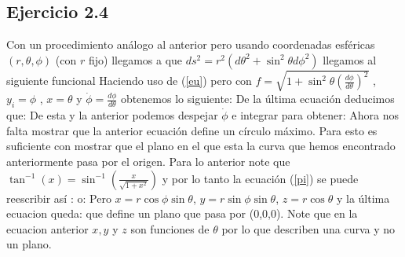 \subsection*{Ejercicio 2.4 }
Con un procedimiento an\'alogo al anterior pero usando coordenadas esf\'ericas $(r,\theta,\phi)$ (con $r$ fijo) llegamos a que $ds^2=r^2(d\theta^2+\sin^2 \theta d\phi^2) $ llegamos al siguiente funcional
Haciendo uso de (\ref{eu}) pero con $f=\sqrt{1+\sin^2\theta \left(\frac{d\phi}{d\theta}\right)^2}$ , $y_i=\phi$ , $x=\theta$ y $\dot \phi=\frac{d\phi}{d\theta}$
obtenemos lo siguiente:
De la \'ultima ecuaci\'on deducimos que:
De esta y la anterior podemos despejar $\dot \phi$ e integrar para obtener:
Ahora nos falta mostrar que la anterior ecuaci\'on define un c\'irculo m\'aximo. Para esto es suficiente con mostrar que el plano en el que esta la curva que hemos encontrado anteriormente pasa por el origen.
Para lo anterior note que $\tan^{-1}(x)=\sin^{-1}\left(\frac{x}{\sqrt{1+x^2}}\right)$ y por lo tanto la ecuaci\'on (\ref{pi}) se  puede reescribir as\'i :
o:
Pero $x=r \cos \phi \sin \theta$, $y=r \sin \phi \sin \theta$, $z=r \cos \theta$ y la \'ultima ecuacion queda:
que define un plano que pasa por (0,0,0). Note que en la ecuacion anterior $x,y$ y $z$ son funciones de $\theta$ por lo que describen una curva y no un plano.

